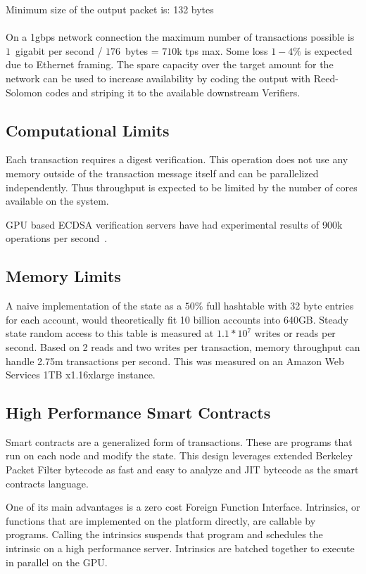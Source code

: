 \documentclass[12pt]{ltjsarticle}
\begin{document}
\noindent Minimum size of the output packet is: 132 bytes \\\\

On a 1gbps network connection the maximum number of transactions possible is $1$~gigabit per second / $176$~bytes = $710$k tps max. Some loss $1-4\%$ is expected due to Ethernet framing. The spare capacity over the target amount for the network can be used to increase availability by coding the output with Reed-Solomon codes and striping it to the available downstream Verifiers.
\subsection{Computational Limits}
Each transaction requires a digest verification. This operation does not use any memory outside of the transaction message itself and can be parallelized independently. Thus throughput is expected to be limited by the number of cores available on the system.

GPU based ECDSA verification servers have had experimental results of 900k operations per second~\cite{gpuecc}.
\subsection{Memory Limits}
A naive implementation of the state as a \(50\%\) full hashtable with 32 byte entries for each account, would theoretically fit 10 billion accounts into 640GB. Steady state random access to this table is measured at \(1.1 * 10^7\) writes or reads per second. Based on 2 reads and two writes per transaction, memory throughput can handle 2.75m transactions per second. This was measured on an Amazon Web Services 1TB x1.16xlarge instance.

\subsection{High Performance Smart Contracts}\label{sec:smartcontracts}

Smart contracts are a generalized form of transactions. These are programs that run on each node and modify the state. This design leverages extended Berkeley Packet Filter bytecode as fast and easy to analyze and JIT bytecode as the smart contracts language.

One of its main advantages is a zero cost Foreign Function Interface. Intrinsics, or  functions that are implemented on the platform directly, are callable by  programs. Calling the intrinsics suspends that program and schedules the intrinsic on a high performance server. Intrinsics are batched together to execute in parallel on the GPU.
\end{document}
